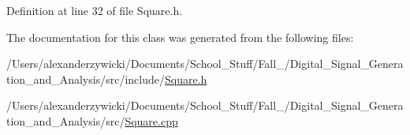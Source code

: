Definition at line 32 of file Square.\+h.



The documentation for this class was generated from the following files\+:\begin{DoxyCompactItemize}
\item 
/\+Users/alexanderzywicki/\+Documents/\+School\+\_\+\+Stuff/\+Fall\+\_/\+Digital\+\_\+\+Signal\+\_\+\+Generation\+\_\+and\+\_\+\+Analysis/src/include/\hyperlink{Square_8h}{Square.\+h}\item 
/\+Users/alexanderzywicki/\+Documents/\+School\+\_\+\+Stuff/\+Fall\+\_/\+Digital\+\_\+\+Signal\+\_\+\+Generation\+\_\+and\+\_\+\+Analysis/src/\hyperlink{Square_8cpp}{Square.\+cpp}\end{DoxyCompactItemize}
